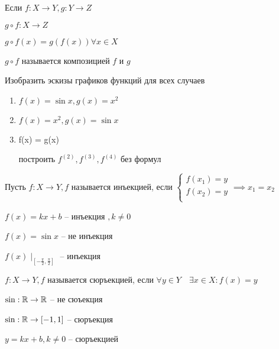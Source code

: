 \begin{definition}
    Если $f:X\to Y, g:Y\to Z$

    $g\circ f:X\to Z$

    $g\circ f(x) = g(f(x)) \forall x\in X$

    $g\circ f$ называется композицией $f$ и $g$
\end{definition}
\begin{example}
    Изобразить эскизы графиков функций для всех случаев
    \begin{enumerate}
        \item $f(x) = \sin  x, g(x) = x^2$
        \item $f(x) = x^2, g(x) = \sin  x$
        \item f(x) = g(x)


построить $f^{(2)}, f^{(3)}, f^{(4)}$ без формул
    \end{enumerate}

\end{example}
   \begin{definition}
       Пусть $f:X\to Y, f$ называется инъекцией, если $\begin{cases}
           f(x_1) = y\\
           f(x_2) = y\\
       \end{cases} \implies  x_1=x_2$
   \end{definition}
    \begin{example}
        $f(x) = kx+b$ -- инъекция $,k\neq 0$

        $f(x) = \sin x$ -- не инъекция

    $f(x)\mid_{[-\frac{\pi}{2}, \frac{\pi}{2}]  }$ -- инъекция

    \end{example}
    \begin{definition}
        $f:X\to Y, f$ называется сюръекцией, если $\forall y\in Y\quad \exists x\in X:f(x) = y$
    \end{definition}
    \begin{example}
        $\sin :\mathbb{R}\to \mathbb{R}$ -- не сюъекция

        $\sin :\mathbb{R}\to [-1,1]$ -- сюръекция

        $y = kx+b, k\neq 0$ -- сюръекцией
    \end{example}

